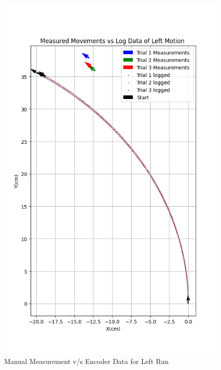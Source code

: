 {        \begin{figure}[!ht] 
            \centering \includegraphics[scale=.60]{"images/experiment_2/Figure_left.png"}
            \caption{Manual Measurement v/s Encoder Data for Left Run}
            \label{fig:left-manual-encoder}
        \end{figure}
    }
    
    
    

